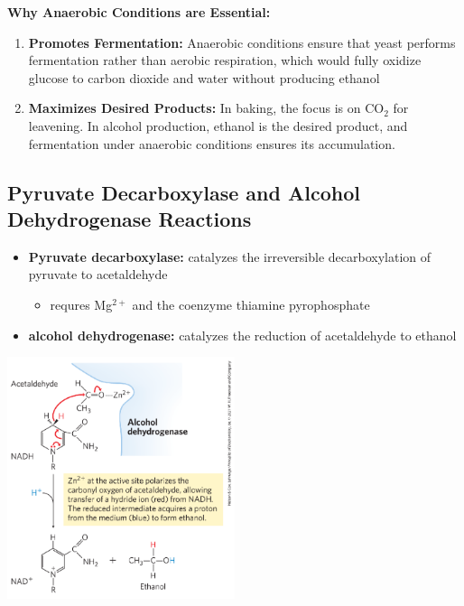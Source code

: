 \documentclass[10pt]{article}
\begin{document}
\textbf{Why Anaerobic Conditions are Essential:}
\begin{enumerate}
    \item \textbf{Promotes Fermentation:} Anaerobic conditions ensure that yeast performs fermentation rather than aerobic respiration, which would fully oxidize glucose to carbon dioxide and water without producing ethanol
    \item \textbf{Maximizes Desired Products:} In baking, the focus is on CO$_2$ for leavening.  In alcohol production, ethanol is the desired product, and fermentation under anaerobic conditions ensures its accumulation.
\end{enumerate}

\subsection*{Pyruvate Decarboxylase and Alcohol Dehydrogenase Reactions}
\begin{itemize}
	\item \textbf{Pyruvate decarboxylase:} catalyzes the irreversible decarboxylation of pyruvate to acetaldehyde
	\begin{itemize}
        \item requres Mg$^{2+}$ and the coenzyme thiamine pyrophosphate
    \end{itemize}
    \item \textbf{alcohol dehydrogenase:} catalyzes the reduction of acetaldehyde to ethanol
\end{itemize}
\begin{center} 
	\includegraphics*[width=0.5\textwidth]{L2_14.png}
\end{center}
\end{document}
